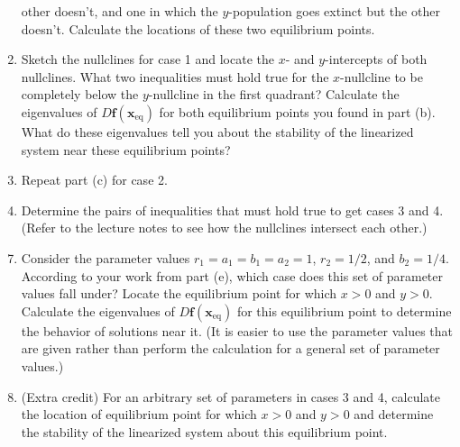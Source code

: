\documentclass[12pt,letterpaper]{hmcpset}
\renewcommand{\bf}[1]{\mathbf{#1}}
\begin{document}
\begin{problem}[5]
\begin{enumerate}
            other doesn't, and one in which the $y$-population goes
            extinct but the other doesn't.  Calculate the locations of
            these two equilibrium points.
        \item Sketch the nullclines for case 1 and locate the $x$- and
            $y$-intercepts of both nullclines.  What two inequalities
            must hold true for the $x$-nullcline to be completely below
            the $y$-nullcline in the first quadrant?  Calculate the
            eigenvalues of $D\bf{f}(\bf{x}_{\text{eq}})$ for
            both equilibrium points you found in part (b). What do these
            eigenvalues tell you about the stability of the linearized
            system near these equilibrium points?
        \item Repeat part (c) for case 2.
        \item Determine the pairs of inequalities that must hold true
            to get cases 3 and 4. (Refer to the lecture notes to see how
            the nullclines intersect each other.)
    \end{enumerate}
\end{problem}
\begin{problem}[5 cont.]
    \begin{enumerate}
        \setcounter{enumi}{6}
        \item Consider the parameter values $r_1=a_1=b_1=a_2=1$,
            $r_2=1/2$, and $b_2=1/4$. According to your work from part
            (e), which case does this set of parameter values fall
            under? Locate the equilibrium point for which $x>0$ and
            $y>0$. Calculate the eigenvalues of
            $D\bf{f}(\bf{x}_{\text{eq}})$ for this equilibrium
            point to determine the behavior of solutions near it. (It is
            easier to use the parameter values that are given rather
            than perform the calculation for a general set of parameter
            values.)
        \item (Extra credit) For an arbitrary set of parameters in
            cases 3 and 4, calculate the location of equilibrium point
            for which $x>0$ and $y>0$ and determine the stability of the
            linearized system about this equilibrium point.
    \end{enumerate}
\end{problem}
\begin{solution}
    \null\vfill
\end{solution}
\end{document}

